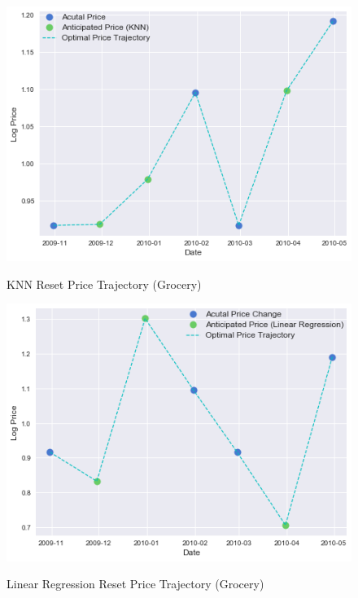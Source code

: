 \documentclass[11pt]{article}
\begin{document}
\begin{figure}[ht]
    \centering
    \caption{KNN Reset Price Trajectory (Grocery)}
    \includegraphics[scale=.8]{knn_reset.png}
    \label{Figure 3}
\end{figure}

\begin{figure}[ht]
    \centering
       \caption{Linear Regression Reset Price Trajectory (Grocery)}
    \includegraphics[scale=.8]{linear_reset.png}
    \label{Figure 4}
\end{figure}
\end{document}
